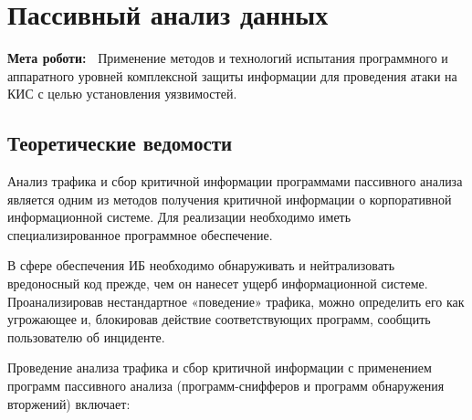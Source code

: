 \chapter{Пассивный анализ данных} \label{chapt8}%
\textbf{Мета роботи:~}%
Применение методов и технологий испытания программного и аппаратного уровней
комплексной защиты информации для проведения атаки на КИС с целью
установления уязвимостей.
\section{Теоретические ведомости} \label{sect7_a}

Анализ трафика и сбор критичной информации программами пассивного анализа
является одним из методов получения критичной информации о корпоративной
информационной системе. Для реализации необходимо иметь специализированное
программное обеспечение.

В сфере обеспечения ИБ необходимо обнаруживать и нейтрализовать вредоносный
код прежде, чем он нанесет ущерб информационной системе. Проанализировав
нестандартное «поведение» трафика, можно определить его как угрожающее и,
блокировав действие соответствующих программ, сообщить пользователю об
инциденте.

Проведение анализа трафика и сбор критичной информации с применением программ
пассивного анализа (программ-снифферов и программ обнаружения вторжений)
включает:


